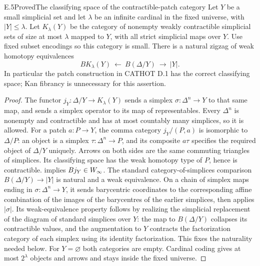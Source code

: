 \begin{statement}{E.5}{Proved}{The classifying space of the contractible-patch category}
Let $Y$ be a small simplicial set and let $\lambda$ be an infinite cardinal in the fixed universe, with $|Y|\leq\lambda$. Let $K_\lambda(Y)$ be the category of nonempty weakly contractible simplicial sets of size at most $\lambda$ mapped to $Y$, with all strict simplicial maps over $Y$. Use fixed subset encodings so this category is small. There is a natural zigzag of weak homotopy equivalences
\[
 BK_\lambda(Y)\ \longleftarrow\ B(\Delta/Y)\ \longrightarrow\ |Y|.
\]
In particular the patch construction in CATHOT D.1 has the correct classifying space; Kan fibrancy is unnecessary for this assertion.
\end{statement}
\begin{proof}
The functor $j_Y:\Delta/Y\to K_\lambda(Y)$ sends a simplex $\sigma:\Delta^n\to Y$ to that same map, and sends a simplex operator to its map of representables. Every $\Delta^n$ is nonempty and contractible and has at most countably many simplices, so it is allowed. For a patch $a:P\to Y$, the comma category $j_Y/(P,a)$ is isomorphic to $\Delta/P$: an object is a simplex $\tau:\Delta^n\to P$, and its composite $a\tau$ specifies the required object of $\Delta/Y$ uniquely. Arrows on both sides are the same commuting triangles of simplices. Its classifying space has the weak homotopy type of $P$, hence is contractible. \citet[\S1, Theorem~A]{E_Quillen1973} implies $Bj_Y\in W_{\infty}$. The standard category-of-simplices comparison $B(\Delta/Y)\to|Y|$ is natural and a weak equivalence. On a chain of simplex maps ending in $\sigma:\Delta^n\to Y$, it sends barycentric coordinates to the corresponding affine combination of the images of the barycentres of the earlier simplices, then applies $|\sigma|$. Its weak-equivalence property follows by realizing the simplicial replacement of the diagram of standard simplices over $Y$: the map to $B(\Delta/Y)$ collapses its contractible values, and the augmentation to $Y$ contracts the factorization category of each simplex using its identity factorization. This fixes the naturality needed below. For $Y=\varnothing$ both categories are empty. Cardinal coding gives at most $2^\lambda$ objects and arrows and stays inside the fixed universe.
\end{proof}

